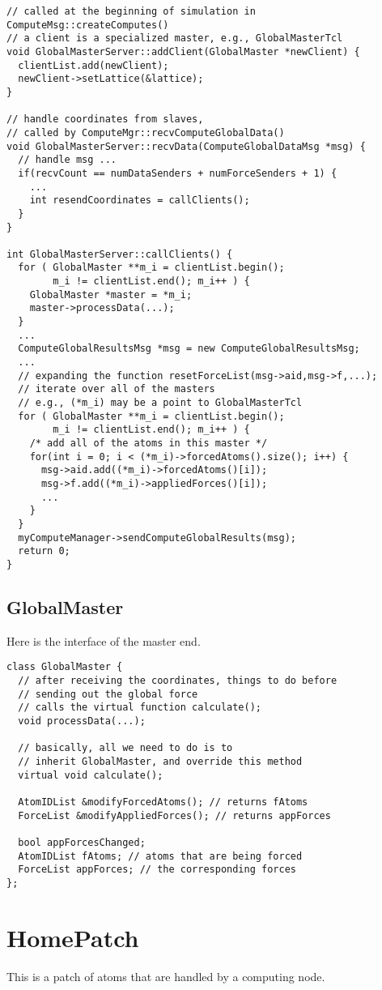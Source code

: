 \documentclass{article}
\begin{document}
\begin{lstlisting}
// called at the beginning of simulation in ComputeMsg::createComputes()
// a client is a specialized master, e.g., GlobalMasterTcl
void GlobalMasterServer::addClient(GlobalMaster *newClient) {
  clientList.add(newClient);
  newClient->setLattice(&lattice);
}

// handle coordinates from slaves,
// called by ComputeMgr::recvComputeGlobalData()
void GlobalMasterServer::recvData(ComputeGlobalDataMsg *msg) {
  // handle msg ...
  if(recvCount == numDataSenders + numForceSenders + 1) {
    ...
    int resendCoordinates = callClients();
  }
}

int GlobalMasterServer::callClients() {
  for ( GlobalMaster **m_i = clientList.begin();
        m_i != clientList.end(); m_i++ ) {
    GlobalMaster *master = *m_i;
    master->processData(...);
  }
  ...
  ComputeGlobalResultsMsg *msg = new ComputeGlobalResultsMsg;
  ...
  // expanding the function resetForceList(msg->aid,msg->f,...);
  // iterate over all of the masters
  // e.g., (*m_i) may be a point to GlobalMasterTcl
  for ( GlobalMaster **m_i = clientList.begin();
        m_i != clientList.end(); m_i++ ) {
    /* add all of the atoms in this master */
    for(int i = 0; i < (*m_i)->forcedAtoms().size(); i++) {
      msg->aid.add((*m_i)->forcedAtoms()[i]);
      msg->f.add((*m_i)->appliedForces()[i]);
      ...
    }
  }
  myComputeManager->sendComputeGlobalResults(msg);
  return 0;
}
\end{lstlisting}


\subsection{GlobalMaster}

Here is the interface of the master end.
\begin{lstlisting}
class GlobalMaster {
  // after receiving the coordinates, things to do before
  // sending out the global force
  // calls the virtual function calculate();
  void processData(...);

  // basically, all we need to do is to
  // inherit GlobalMaster, and override this method
  virtual void calculate();

  AtomIDList &modifyForcedAtoms(); // returns fAtoms
  ForceList &modifyAppliedForces(); // returns appForces

  bool appForcesChanged;
  AtomIDList fAtoms; // atoms that are being forced
  ForceList appForces; // the corresponding forces
};
\end{lstlisting}


\section{HomePatch}

This is a patch of atoms that are handled by a computing node.







%
%
\end{document}
